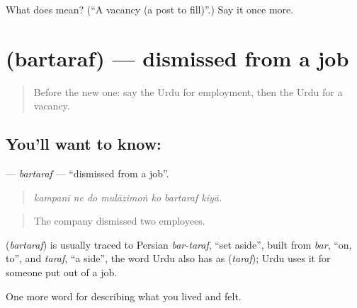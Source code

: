 \begin{tcolorbox}[breakable,colback=teal!4,colframe=teal!35!black,title={Before you move on}]
What does  mean? (\textquotedblleft{}A vacancy (a post to fill)\textquotedblright{}.) Say it once more.
\end{tcolorbox}
\section[\texorpdfstring{\ur{برطرف} (bartaraf)}{برطرف (bartaraf)}]{ (bartaraf) — dismissed from a job}

\label{lesson:UR-C494-bartaraf}



\begin{quote}
Before the new one: say the Urdu for employment, then the Urdu for a vacancy.
\end{quote}

\subsection*{You'll want to know: }
\textbf{} — \emph{bartaraf} — \textquotedblleft{}dismissed from a job\textquotedblright{}.

\begin{quote}
      
\end{quote}

\begin{quote}
\emph{kampanī ne do mulāzimoṅ ko bartaraf kiyā.}
\end{quote}

\begin{quote}
The company dismissed two employees.
\end{quote}

\begin{cousinweb}
\textbf{} (\emph{bartaraf}) is usually traced to Persian \emph{bar-taraf}, \textquotedblleft{}set aside\textquotedblright{}, built from \emph{bar}, \textquotedblleft{}on, to\textquotedblright{}, and \emph{taraf}, \textquotedblleft{}a side\textquotedblright{}, the word Urdu also has as \textbf{} (\emph{taraf}); Urdu uses it for someone put out of a job.
\end{cousinweb}

\begin{grammarlens}[title={What you've built}]
One more word for describing what you lived and felt.
\end{grammarlens}


